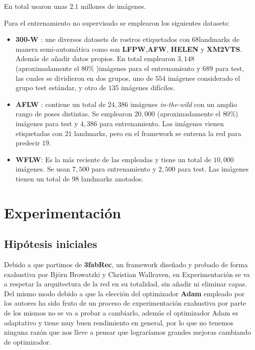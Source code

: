         \noindent En total usaron unas $2.1$ millones de imágenes.

        \noindent Para el entrenamiento no supervisado se emplearon los siguientes datasets: 

        \begin{itemize}
            \item \textbf{300-W} : une diversos datasets de rostros etiquetados con \textbf{$68$}landmarks de manera semi-automática como son \textbf{LFPW},\textbf{AFW}, \textbf{HELEN} y \textbf{XM2VTS}. Además de añadir datos propios. En total emplearon $3,148$ (aproximadamente el $80 \%$ )imágenes para el entrenamiento y $689$ para test, las cuales se dividieron en dos grupos, uno de $554$ imágenes considerado el grupo test estándar, y otro de $135$ imágenes difíciles.
            \item \textbf{AFLW} : contiene un total de $24,386$ imágenes \textit{in-the-wild} con un amplio rango de poses distintas. Se emplearon $20,000$ (aproximadamente el $80 \%$) imágenes para test y $4,386$ para entrenamiento. Las imágenes vienen etiquetadas con $21$ landmarks, pero en el framework se entrena la red para predecir \textbf{$19$}.
            \item \textbf{WFLW}: Es la más reciente de las empleadas y tiene un total de $10,000$ imágenes. Se usan $7,500$ para entrenamiento y $2,500$ para test. Las imágenes tienen un total de \textbf{$98$} landmarks anotados.
        \end{itemize}

\section{Experimentación}
    \subsection{Hipótesis iniciales}
        \noindent Debido a que partimos de \textbf{3fabRec}, un framework diseñado y probado de forma exahustiva por Björn Browatzki y Christian Wallraven, en Experimentación se va a respetar la arquitectura de la red en su totalidad, sin añadir ni eliminar capas. Del mismo modo debido a que la elección del optimizador \textbf{Adam} empleado por los autores ha sido fruto de un proceso de experimentación exahustiva por parte de los mismos no se va a probar a cambiarlo, además el optimizador Adam es adaptativo y tiene muy buen rendimiento en general, por lo que no tenemos ninguna razón que nos lleve a pensar que lograríamos grandes mejoras cambiando de optimizador.

